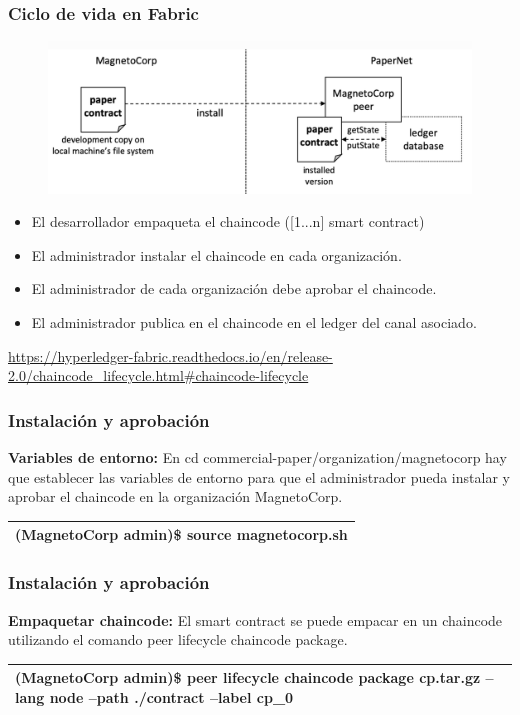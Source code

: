 \documentclass{beamer}
\begin{document}
	\begin{frame}
		\frametitle{Ciclo de vida en Fabric}
		\begin{figure}[h]
			\includegraphics[scale=.4]{papernet_02}
			\centering
		\end{figure}
		\begin{itemize}
			\item El desarrollador empaqueta el chaincode ([1...n] smart contract)
			\item El administrador instalar el chaincode en cada organización.
			\item El administrador de cada organización debe aprobar el chaincode.
			\item El administrador publica en el chaincode en el ledger del canal asociado.
		\end{itemize}
		{\tiny \url{https://hyperledger-fabric.readthedocs.io/en/release-2.0/chaincode\_lifecycle.html\#chaincode-lifecycle} }
	\end{frame}
	
	\begin{frame}
		\frametitle{Instalación y aprobación}
		\textbf{Variables de entorno:} En cd commercial-paper/organization/magnetocorp hay que establecer las variables de entorno para que el administrador pueda instalar y aprobar el chaincode en la organización MagnetoCorp.\\
		\begin{center}
			\begin{tabulary}{\linewidth}{L}
				\hline
				(MagnetoCorp admin)\$ source magnetocorp.sh\\
				\hline
			\end{tabulary} 
		\end{center}
	\end{frame}
	
	\begin{frame}
		\frametitle{Instalación y aprobación}
		\textbf{Empaquetar chaincode:} El smart contract se puede empacar en un chaincode utilizando el comando peer lifecycle chaincode package.\\
		\begin{center}
			\begin{tabulary}{\linewidth}{L}
				\hline
				(MagnetoCorp admin)\$ peer lifecycle chaincode package cp.tar.gz --lang node --path ./contract --label cp\_0\\
				\hline
			\end{tabulary} 
		\end{center}
	\end{frame}
	
\end{document}
